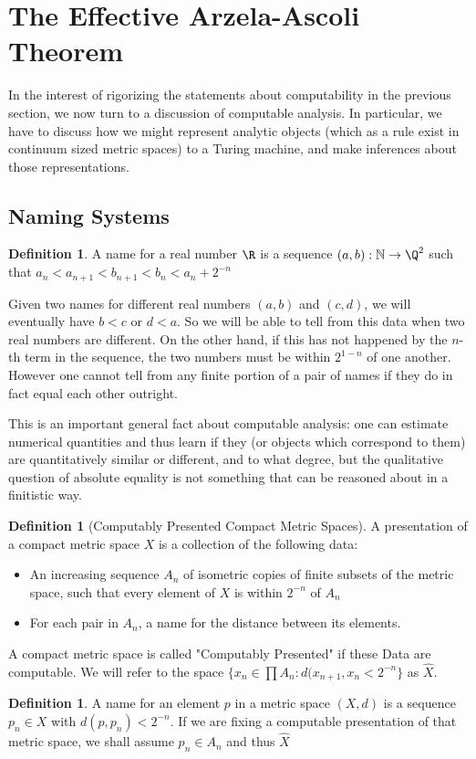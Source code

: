\documentclass{journal}
\theoremstyle{definition}
\newtheorem{dfn}[thm]{Definition}
\newcommand{\N}{\mathbb{N}}
\begin{document}
\section{The Effective Arzela-Ascoli Theorem}
\label{sec:three}
In the interest of rigorizing the statements about computability in the previous section, we now turn to a discussion of computable analysis. In particular, we have to discuss how we might represent analytic objects (which as a rule exist in continuum sized metric spaces) to a Turing machine, and make inferences about those representations.

\subsection{Naming Systems}
\label{sec:naming}
\begin{dfn}
    A name for a real number $\R$ is a sequence $(a,b):\N\rightarrow \Q^2$ such that $a_n < a_{n+1} < b_{n+1} < b_n < a_{n}+2^{-n} $
\end{dfn}
\label{dfn:names}

Given two names for different real numbers $(a ,b)$ and $(c,d)$, we will eventually have $b < c$ or $d < a$. So we will be able to tell from this data when two real numbers are different. On the other hand, if this has not happened by the $n$-th term in the sequence, the two numbers must be within $2^{1-n}$ of one another. However one cannot tell from any finite portion of a pair of names if they do in fact equal each other outright.

This is an important general fact about computable analysis: one can estimate numerical quantities and thus learn if they (or objects which correspond to them) are quantitatively similar or different, and to what degree, but the qualitative question of absolute equality is not something that can be reasoned about in a finitistic way.

\begin{dfn}[Computably Presented Compact Metric Spaces]
    A presentation of a compact metric space $X$ is a collection of the following data:
    \begin{itemize}
        \item An increasing sequence $A_n$ of isometric copies of finite subsets of the metric space, such that every element of $X$ is within $2^{-n}$ of $A_n$
        \item For each pair in $A_n$, a name for the distance between its elements.
        
    \end{itemize}
    A compact metric space is called "Computably Presented" if these Data are computable. We will refer to the space $\{x_n\in\prod A_n: d(x_{n+1}, x_{n} < 2^{-n}\}$ as $\hat{X}$.
\end{dfn}
\label{dfn:cpmetricspace}
\begin{dfn}
    A name for an element $p$ in a metric space $(X,d)$ is a sequence $p_n \in X$ with $d(p,p_n) < 2^{-n}$. If we are fixing a computable presentation of that metric space, we shall assume $p_n\in A_n$ and thus $\hat{X}$
\end{dfn}
\label{dfn:nameinmet}
\end{document}
